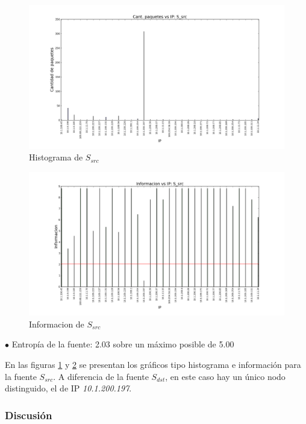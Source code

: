 \begin{figure}[H]\centering
    \includegraphics[width=\linewidth]{../imgs/red-entrepiso-dc_S_src_hist.png}
    \caption{Histograma de $S_{src}$}\label{fig:entrepiso-dc-src-hist}
\end{figure}

\begin{figure}[H]\centering
    \includegraphics[width=\linewidth]{../imgs/red-entrepiso-dc_S_src_info.png}
    \caption{Informacion de $S_{src}$}\label{fig:entrepiso-dc-src-info}
\end{figure}

$\bullet$ Entropía de la fuente: 2.03 sobre un máximo posible de 5.00

En las figuras \ref{fig:entrepiso-dc-src-hist} y \ref{fig:entrepiso-dc-src-info} se presentan los gráficos tipo histograma e información para la fuente $S_{src}$. A diferencia de la fuente $S_{dst}$, en este caso hay un único nodo distinguido, el de IP \emph{10.1.200.197}.

\subsubsection{Discusión}

